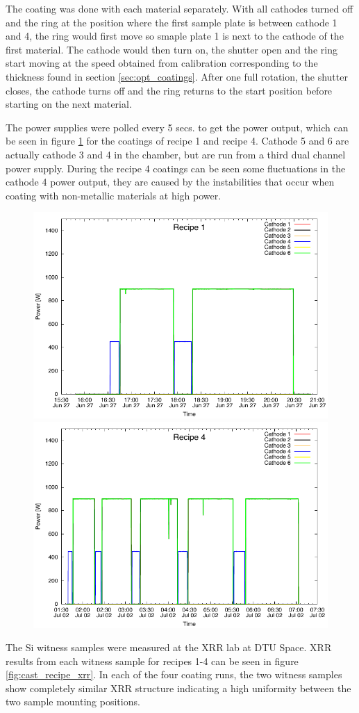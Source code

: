 The coating was done with each material separately. With all cathodes turned off and the ring at the position where the first sample plate is between cathode 1 and 4, the ring would first move so smaple plate 1 is next to the cathode of the first material. The cathode would then turn on, the shutter open and the ring start moving at the speed obtained from calibration corresponding to the thickness found in section \ref{sec:opt_coatings}. After one full rotation, the shutter closes, the cathode turns off and the ring returns to the start position before starting on the next material.

The power supplies were polled every 5 secs. to get the power output, which can be seen in figure \ref{fig:cast_coatings_power} for the coatings of recipe 1 and recipe 4. Cathode 5 and 6 are actually cathode 3 and 4 in the chamber, but are run from a third dual channel power supply. During the recipe 4 coatings can be seen some fluctuations in the cathode 4 power output, they are caused by the  instabilities that occur when coating with non-metallic materials at high power.

\begin{figure}[htbp]
  \centering  \includegraphics[width=0.45\linewidth]{figures/cast/power_recipe1.pdf}  \includegraphics[width=0.45\linewidth]{figures/cast/power_recipe4.pdf}\\
  \caption{\footnotesize }
  \label{fig:cast_coatings_power}
\end{figure}

The Si witness samples were measured at the XRR lab at DTU Space. XRR results from each witness sample for recipes 1-4 can be seen in figure \ref{fig:cast_recipe_xrr}. In each of the four coating runs, the two witness samples show completely similar XRR structure indicating a high uniformity between the two sample mounting positions.

